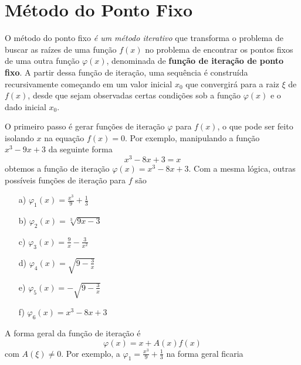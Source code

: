 
\section{Método do Ponto Fixo}

O método do ponto fixo \emph{é um método iterativo} que %
transforma o problema de buscar as raízes de uma função $f(x)$ no problema de encontrar os pontos fixos de uma outra função $\varphi(x)$, denominada de \textbf{função de iteração de ponto fixo}. 
A partir dessa função de iteração, uma sequência é construída recursivamente começando em um valor inicial $x_0$ que convergirá para a raiz $\xi$ de $f(x)$, desde que sejam observadas certas condições sob a função $\varphi(x)$ e o dado inicial $x_0$.

O primeiro passo é gerar funções de iteração $\varphi$ para $f(x)$, o que pode ser feito isolando $x$ na equação $f(x) = 0$. Por exemplo, manipulando a função $x^3 -9x + 3$  da seguinte forma 
\begin{equation*}
    x^3 - 8x + 3 = x 
\end{equation*} 
obtemos a função de iteração $\varphi(x) = x^3 - 8x + 3$. Com a mesma lógica, outras possíveis funções de iteração para $f$ são

\begin{multicols}{2}
\begin{itemize} %
    \item[a)] $\varphi_1(x) = \frac{x^3}{9} + \frac{1}{3}$
    \item[b)] $\varphi_2(x) = \sqrt[3]{9x-3}$
    \item[c)] $\varphi_3(x) = \frac{9}{x} - \frac{3}{x^2}$
    \item[d)] $\varphi_4(x) = \sqrt{9 - \frac{3}{x}}$
    \item[e)] $\varphi_5(x) = -\sqrt{9 - \frac{3}{x}}$
    \item[f)] $\varphi_6(x) = x^3 - 8x + 3$
\end{itemize}
\end{multicols}
A forma geral da função de iteração é 
\begin{equation}
    \varphi(x) = x + A(x)f(x) \label{it}
\end{equation}
com $A(\xi) \ne 0$.
Por exemplo, a $\varphi_1 = \frac{x^3}{9} + \frac{1}{3}$ na forma geral ficaria 

